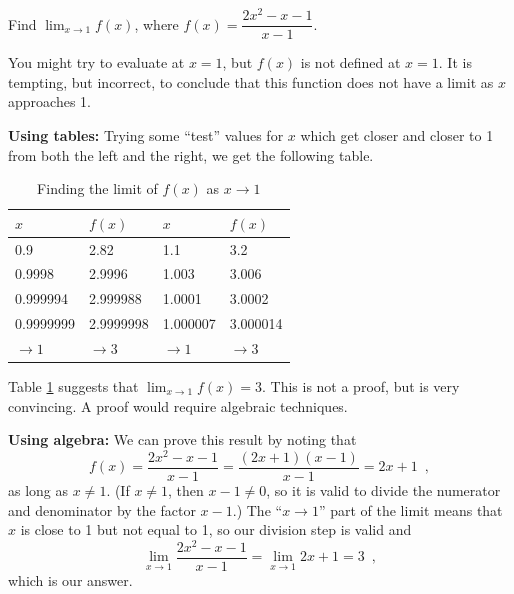 \begin{example}
Find $\displaystyle\lim_{x\to 1}f(x)$, where $f(x) = \dfrac{2x^2-x-1}{x-1}$.

\begin{solution} You might try to evaluate at $x=1$, but $f(x)$ is not defined at $x=1$. It is tempting, but incorrect, to conclude that this function does not have a limit as $x$ approaches 1.

{\bf Using tables:} Trying some ``test'' values for $x$ which get closer and closer to 1 from both the left and the right, we get the following table. 
\begin{table}[ht!]
\begin{centering}
\begin{tabular}{ll||ll}
\toprule
$x$ & 	$f(x)$ & $x$ &	$f(x)$\\					
\midrule
0.9	        & 2.82      & 1.1       & 3.2 \\
0.9998      & 2.9996	& 1.003	    & 3.006 \\
0.999994    & 2.999988	& 1.0001	& 3.0002 \\
0.9999999   & 2.9999998	& 1.000007	& 3.000014 \\
$\to 1$     & $\to 3$   & $\to 1$   & $\to 3$ \\
\bottomrule
\end{tabular}
\caption{Finding the limit of $f(x)$ as $x\to 1$}
\label{tab:2-4-limitex}
\end{centering}
\end{table}
Table \ref{tab:2-4-limitex} suggests that $\displaystyle\lim_{x\to 1}f(x) = 3$. This is not a proof, but is very convincing. A proof would require algebraic techniques.

{\bf Using algebra:} We can prove this result by noting that
$$f(x)=\dfrac{2x^2-x-1}{x-1}=\frac{(2x+1)(x-1)}{x-1}=2x+1 \enspace ,$$
as long as $x\neq 1$. (If $x\neq 1$, then $x-1\neq 0$, so it is valid to divide the numerator and denominator by the factor $x-1$.) The ``$x\to 1$'' part of the limit means that $x$ is close to 1 but not equal to 1, so our division step is valid and
$$\lim_{x\to 1}\dfrac{2x^2-x-1}{x-1}=\lim_{x\to 1}2x+1=3 \enspace,$$
which is our answer.


\end{solution}
\end{example}

